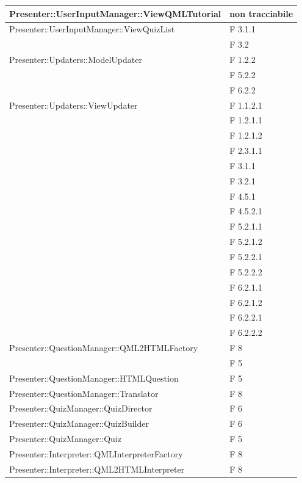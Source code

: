 \documentclass[a4paper,11pt]{article}
\begin{document}
\begin{longtable}{p{}p{}}
\midrule
Presenter::UserInputManager::ViewQMLTutorial	& non tracciabile\\
\midrule
Presenter::UserInputManager::ViewQuizList		& F 3.1.1\\
												& F 3.2\\
\midrule
Presenter::Updaters::ModelUpdater	& F 1.2.2\\
									& F 5.2.2\\
									& F 6.2.2\\
\midrule
Presenter::Updaters::ViewUpdater	& F 1.1.2.1\\
									& F 1.2.1.1\\
									& F 1.2.1.2\\
									& F 2.3.1.1\\
									& F 3.1.1\\
									& F 3.2.1\\
									& F 4.5.1\\
									& F 4.5.2.1\\
									& F 5.2.1.1\\
									& F 5.2.1.2\\
									& F 5.2.2.1\\
									& F 5.2.2.2\\
									& F 6.2.1.1\\
									& F 6.2.1.2\\
									& F 6.2.2.1\\
									& F 6.2.2.2\\
\midrule
Presenter::QuestionManager::QML2HTMLFactory	& F 8\\
											& F 5\\

\midrule
Presenter::QuestionManager::HTMLQuestion	& F 5\\

\midrule
Presenter::QuestionManager::Translator		& F 8\\

\midrule
Presenter::QuizManager::QuizDirector	& F 6\\

\midrule
Presenter::QuizManager::QuizBuilder	& F 6\\

\midrule
Presenter::QuizManager::Quiz	& F 5\\

\midrule
Presenter::Interpreter::QMLInterpreterFactory	& F 8\\

\midrule
Presenter::Interpreter::QML2HTMLInterpreter		& F 8\\

\midrule
							
	\end{longtable}			
	\newpage
	
\end{document}
